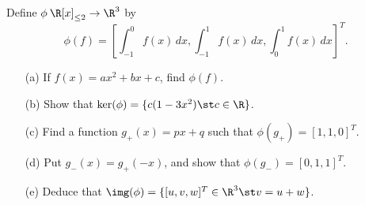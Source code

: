 \begin{exercise}\label{ex-inj-misc-iii}
 Define $\phi\:\R[x]_{\leq 2}\to\R^3$ by 
 \[ \phi(f) =
      \left[ \int_{-1}^0 f(x)\,dx, 
             \int_{-1}^1 f(x)\,dx,
             \int_0^1    f(x)\,dx \right]^T.
 \]
 \begin{itemize}
  \item[(a)] If $f(x)=ax^2+bx+c$, find $\phi(f)$.
  \item[(b)] Show that $\ker(\phi)=\{c(1-3x^2)\st c\in\R\}$.
  \item[(c)] Find a function $g_+(x)=px+q$ such that
   $\phi(g_+)=[1,1,0]^T$.
  \item[(d)] Put $g_-(x)=g_+(-x)$, and show that
   $\phi(g_-)=[0,1,1]^T$. 
  \item[(e)] Deduce that $\img(\phi)=\{[u,v,w]^T\in\R^3\st v=u+w\}$.
 \end{itemize}
\end{exercise}

